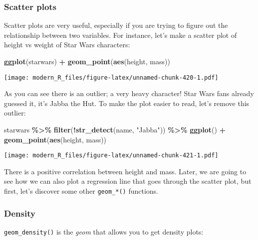 \documentclass[
]{article}
\newenvironment{Shaded}{\begin{snugshade}}{\end{snugshade}}
\newcommand{\KeywordTok}[1]{\textcolor[rgb]{0.13,0.29,0.53}{\textbf{#1}}}
\newcommand{\NormalTok}[1]{#1}
\newcommand{\OperatorTok}[1]{\textcolor[rgb]{0.81,0.36,0.00}{\textbf{#1}}}
\newcommand{\StringTok}[1]{\textcolor[rgb]{0.31,0.60,0.02}{#1}}
\begin{document}
\hypertarget{scatter-plots}{%
\subsubsection{Scatter plots}\label{scatter-plots}}

Scatter plots are very useful, especially if you are trying to figure out the relationship between two variables.
For instance, let's make a scatter plot of height vs weight of Star Wars characters:

\begin{Shaded}
\begin{Highlighting}[]
\KeywordTok{ggplot}\NormalTok{(starwars) }\OperatorTok{+}
\StringTok{  }\KeywordTok{geom\_point}\NormalTok{(}\KeywordTok{aes}\NormalTok{(height, mass))}
\end{Highlighting}
\end{Shaded}

\texttt{[image: modern\_R\_files/figure-latex/unnamed-chunk-420-1.pdf]}

As you can see there is an outlier; a very heavy character! Star Wars fans already guessed it, it's Jabba the Hut.
To make the plot easier to read, let's remove this outlier:

\begin{Shaded}
\begin{Highlighting}[]
\NormalTok{starwars }\OperatorTok{\%\textgreater{}\%}
\StringTok{  }\KeywordTok{filter}\NormalTok{(}\OperatorTok{!}\KeywordTok{str\_detect}\NormalTok{(name, }\StringTok{"Jabba"}\NormalTok{)) }\OperatorTok{\%\textgreater{}\%}
\StringTok{  }\KeywordTok{ggplot}\NormalTok{() }\OperatorTok{+}
\StringTok{    }\KeywordTok{geom\_point}\NormalTok{(}\KeywordTok{aes}\NormalTok{(height, mass))}
\end{Highlighting}
\end{Shaded}

\texttt{[image: modern\_R\_files/figure-latex/unnamed-chunk-421-1.pdf]}

There is a positive correlation between height and mass. Later, we are going to see how we can also plot a regression
line that goes through the scatter plot, but first, let's discover some other \texttt{geom\_*()} functions.

\hypertarget{density}{%
\subsubsection{Density}\label{density}}

\texttt{geom\_density()} is the \emph{geom} that allows you to get density plots:
\end{document}

